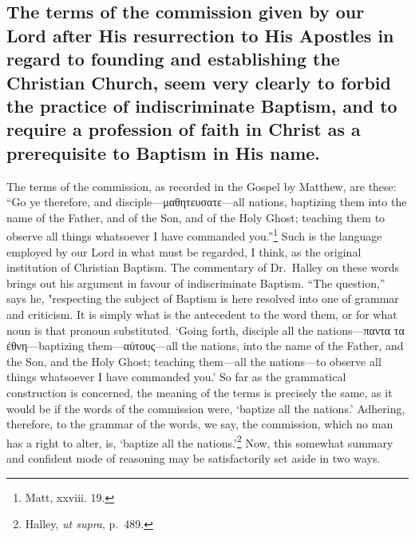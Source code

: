 \documentclass[]{book}
\begin{document}
\hypertarget{the-terms-of-the-commission-given-by-our-lord-after-his-resurrection-to-his-apostles-in-regard-to-founding-and-establishing-the-christian-church-seem-very-clearly-to-forbid-the-practice-of-indiscriminate-baptism-and-to-require-a-profession-of-faith-in-christ-as-a-prerequisite-to-baptism-in-his-name.}{%
\subsection{The terms of the commission given by our Lord after His resurrection to His Apostles in regard to founding and establishing the Christian Church, seem very clearly to forbid the practice of indiscriminate Baptism, and to require a profession of faith in Christ as a prerequisite to Baptism in His name.}\label{the-terms-of-the-commission-given-by-our-lord-after-his-resurrection-to-his-apostles-in-regard-to-founding-and-establishing-the-christian-church-seem-very-clearly-to-forbid-the-practice-of-indiscriminate-baptism-and-to-require-a-profession-of-faith-in-christ-as-a-prerequisite-to-baptism-in-his-name.}}

The terms of the commission, as recorded in the Gospel by Matthew, are these: ``Go ye therefore, and disciple---μαθητευσατε---all nations, baptizing them into the name of the Father, and of the Son, and of the Holy Ghost; teaching them to observe all things whatsoever I have commanded you.''\footnote{Matt, xxviii. 19.} Such is the language employed by our Lord in what must be regarded, I think, as the original institution of Christian Baptism. The commentary of Dr.~Halley on these words brings out his argument in favour of indiscriminate Baptism. ``The question,'' says he, "respecting the subject of Baptism is here resolved into one of grammar and criticism. It is simply what is the antecedent to the word them, or for what noun is that pronoun substituted. `Going forth, disciple all the nations---παντα τα ἐθνη---baptizing them---αὐτους---all the nations, into the name of the Father, and the Son, and the Holy Ghost; teaching them---all the nations---to observe all things whatsoever I have commanded you.' So far as the grammatical construction is concerned, the meaning of the terms is precisely the same, as it would be if the words of the commission were, `baptize all the nations.' Adhering, therefore, to the grammar of the words, we say, the commission, which no man has a right to alter, is, `baptize all the nations.'\footnote{Halley, \emph{ut supra}, p.~489.} Now, this somewhat summary and confident mode of reasoning may be satisfactorily set aside in two ways.
\end{document}
